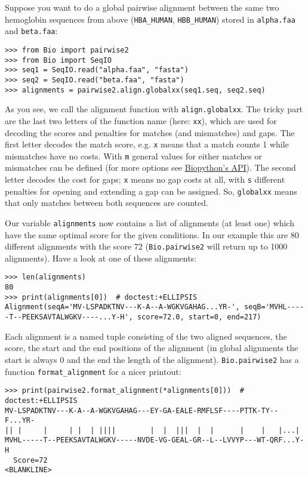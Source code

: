Suppose you want to do a global pairwise alignment between the same two
hemoglobin sequences from above (\texttt{HBA\_HUMAN}, \texttt{HBB\_HUMAN})
stored in \texttt{alpha.faa} and \texttt{beta.faa}:

\begin{verbatim}
>>> from Bio import pairwise2
>>> from Bio import SeqIO
>>> seq1 = SeqIO.read("alpha.faa", "fasta")
>>> seq2 = SeqIO.read("beta.faa", "fasta")
>>> alignments = pairwise2.align.globalxx(seq1.seq, seq2.seq)
\end{verbatim}

As you see, we call the alignment function with \verb|align.globalxx|. The tricky
part are the last two letters of the function name (here: \texttt{xx}), which are
used for  decoding the scores and penalties for matches (and mismatches) and gaps.
The first letter decodes the match score, e.g. \texttt{x} means that a match counts
1 while mismatches have no costs. With \texttt{m} general values for either matches
or mismatches can be defined
(for more options see \href{http://biopython.org/docs/1.77/api/Bio.pairwise2.html}{Biopython's API}).
The second letter decodes the cost for gaps; \texttt{x} means no gap costs at all,
with \texttt{s} different penalties for opening and extending a gap can be assigned.
So, \verb|globalxx| means that only matches between both sequences are counted.

Our variable \texttt{alignments} now contains a list of alignments (at least one) which
have the same optimal score for the given conditions. In our example this are 80
different alignments with the score 72 (\verb|Bio.pairwise2| will return up to 1000
alignments). Have a look at one of these alignments:

\begin{verbatim}
>>> len(alignments)
80
>>> print(alignments[0])  # doctest:+ELLIPSIS
Alignment(seqA='MV-LSPADKTNV---K-A--A-WGKVGAHAG...YR-', seqB='MVHL-----T--PEEKSAVTALWGKV----...Y-H', score=72.0, start=0, end=217)
\end{verbatim}

Each alignment is a named tuple consisting of the two aligned sequences, the score, the
start and the end positions of the alignment (in global alignments the start is
always 0 and the end the length of the alignment). \verb|Bio.pairwise2| has a
function \verb|format_alignment| for a nicer printout:

\begin{verbatim}
>>> print(pairwise2.format_alignment(*alignments[0]))  # doctest:+ELLIPSIS
MV-LSPADKTNV---K-A--A-WGKVGAHAG---EY-GA-EALE-RMFLSF----PTTK-TY--F...YR-
|| |     |     | |  | ||||        |  |  |||  |  |      |    |   |...|  
MVHL-----T--PEEKSAVTALWGKV-----NVDE-VG-GEAL-GR--L--LVVYP---WT-QRF...Y-H
  Score=72
<BLANKLINE>
\end{verbatim}

